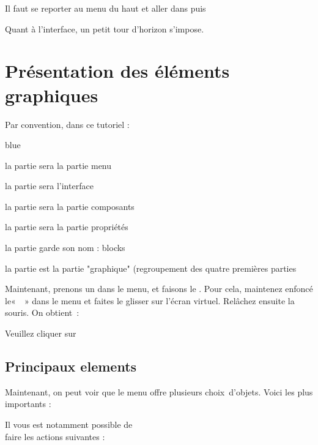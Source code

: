 Il faut se reporter au menu du haut et aller dans  puis 



Quant à l'interface, un petit tour d'horizon s'impose.

\section{Présentation des éléments graphiques}

Par convention, dans ce tutoriel :

\begin{items}{blue}{\Triangle}
    \item la partie  sera la partie menu
    \item la partie   sera l'interface
    \item la partie   sera la partie composants
    \item la partie   sera la partie propriétés
    \item la partie   garde son nom : blocks
    \item la partie  est la partie "graphique" (regroupement des quatre premières parties
\end{items}

Maintenant, prenons un  dans le menu, et faisons le . 
Pour cela, maintenez enfoncé le«  » dans le menu et faites le glisser sur l'écran virtuel. Relâchez ensuite la souris. On obtient :


Veuillez cliquer sur 


\subsection{Principaux elements} \label{menu}

Maintenant, on peut voir que le menu offre plusieurs choix d'objets. Voici les plus importants :

Il vous est notamment possible de \\faire les actions suivantes :

